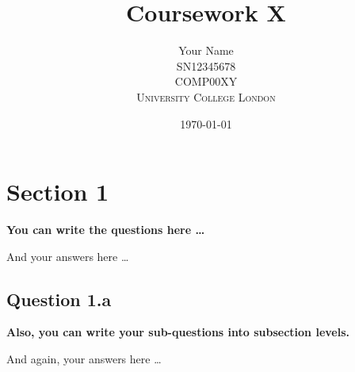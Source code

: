 \documentclass[12pt]{article}
\title{Coursework X} %
\author{Your Name\\
SN12345678\\
COMP00XY\\ %
\textsc{University College London}
}
\date{\today} %
\begin{document}
\maketitle

\section*{Section 1}
{\bfseries You can write the questions here \ldots}

And your answers here \ldots

\subsection*{Question 1.a}
{\bfseries Also, you can write your sub-questions into subsection levels.}

And again, your answers here \ldots

\nocite{*}

% 
\end{document}
